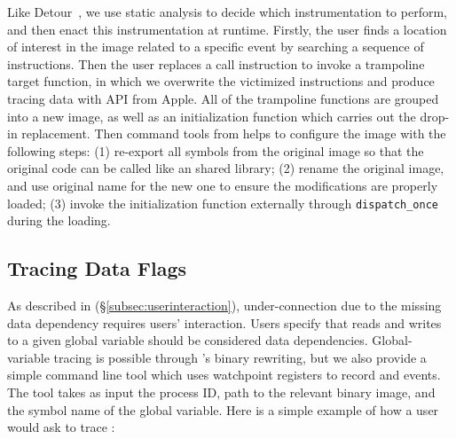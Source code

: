 Like Detour~\cite{hunt1999detours}, we use static analysis to decide which
instrumentation to perform, and then enact this instrumentation at runtime.
Firstly, the user finds a location of interest in the image related to a
specific event by searching a sequence of instructions. Then the user replaces a
call instruction to invoke a trampoline target function, in which we overwrite
the victimized instructions and produce tracing data with API from Apple.
All of the trampoline functions are grouped into a new image, as well as an
initialization function which carries out the drop-in replacement. Then command
tools from \xxx helps to configure the image with the following steps: (1)
re-export all symbols from the original image so that the original code can be
called like an shared library; (2) rename the original image, and use original
name for the new one to ensure the modifications are properly loaded; (3) invoke
the initialization function externally through \texttt{dispatch\_once} during
the loading.



\subsection{Tracing Data Flags} \label{subsec:tcp}
As described in (\S\ref{subsec:userinteraction}), under-connection due
to the missing data dependency requires users' interaction.
Users specify that reads and writes to a given global variable should be considered data dependencies.
Global-variable tracing is possible through \xxx's binary rewriting, but we also provide a
simple command line tool which uses watchpoint registers to record
\dataflagwrite and \dataflagread events. The tool takes as input the process ID,
path to the relevant binary image, and the symbol name of the global variable. Here is
a simple example of how a user would ask \xxx to trace :

